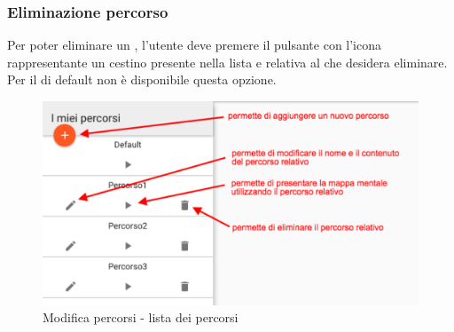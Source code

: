 \subsubsection{Eliminazione percorso}
Per poter eliminare un , l'utente deve premere il pulsante con l'icona rappresentante un cestino presente nella lista  e relativa al  che desidera eliminare.\\
Per il  di default non è disponibile questa opzione.
\begin{figure}[H]
\centering
\includegraphics[scale=0.5]{immagini/menuPercorsi.pdf}
\caption{Modifica percorsi - lista dei percorsi}
\end{figure}
